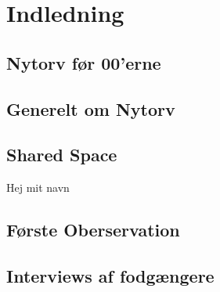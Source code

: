 \chapter{Indledning}
\label{chap:Indledning}

\section{Nytorv før 00'erne}
\label{sec:Nytorv før 00'erne}

\section{Generelt om Nytorv}
\label{sec:Generelt om Nytorv}

\section{Shared Space}
\label{sec:Shared Space}
Hej mit navn \cite {datasheet_pir1}
\section{Første Oberservation}
\label{sec:Første Oberservation}

\section{Interviews af fodgængere}
\label{sec:Interviews af fodgængere}
